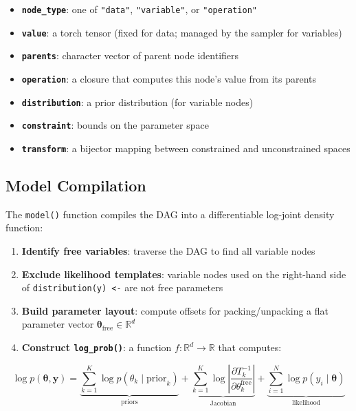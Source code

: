 \documentclass[
  11pt,
]{article}
\providecommand{\tightlist}{%
  \setlength{\itemsep}{0pt}\setlength{\parskip}{0pt}}
\begin{document}
\begin{itemize}
\tightlist
\item
  \textbf{\texttt{node\_type}}: one of \texttt{"data"},
  \texttt{"variable"}, or \texttt{"operation"}
\item
  \textbf{\texttt{value}}: a torch tensor (fixed for data; managed by
  the sampler for variables)
\item
  \textbf{\texttt{parents}}: character vector of parent node identifiers
\item
  \textbf{\texttt{operation}}: a closure that computes this node's value
  from its parents
\item
  \textbf{\texttt{distribution}}: a prior distribution (for variable
  nodes)
\item
  \textbf{\texttt{constraint}}: bounds on the parameter space
\item
  \textbf{\texttt{transform}}: a bijector mapping between constrained
  and unconstrained spaces
\end{itemize}

\subsection{Model Compilation}\label{model-compilation}

The \texttt{model()} function compiles the DAG into a differentiable
log-joint density function:

\begin{enumerate}
\def\labelenumi{\arabic{enumi}.}
\tightlist
\item
  \textbf{Identify free variables}: traverse the DAG to find all
  variable nodes
\item
  \textbf{Exclude likelihood templates}: variable nodes used on the
  right-hand side of \texttt{distribution(y)\ \textless{}-} are not free
  parameters
\item
  \textbf{Build parameter layout}: compute offsets for packing/unpacking
  a flat parameter vector
  \(\boldsymbol\theta_{\text{free}} \in \mathbb{R}^d\)
\item
  \textbf{Construct \texttt{log\_prob()}}: a function
  \(f: \mathbb{R}^d \to \mathbb{R}\) that computes:
\end{enumerate}

\[\log p(\boldsymbol\theta, \mathbf{y}) = \underbrace{\sum_{k=1}^{K} \log p(\theta_k \mid \text{prior}_k)}_{\text{priors}} + \underbrace{\sum_{k=1}^{K} \log \left| \frac{\partial T_k^{-1}}{\partial \theta_k^{\text{free}}} \right|}_{\text{Jacobian}} + \underbrace{\sum_{i=1}^{N} \log p(y_i \mid \boldsymbol\theta)}_{\text{likelihood}}\]
\end{document}
